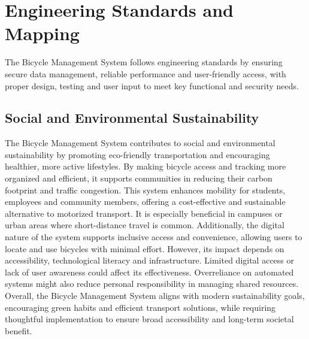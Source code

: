 \chapter{Engineering Standards and Mapping}
The Bicycle Management System follows engineering standards by ensuring secure data management, reliable performance and user-friendly access, with proper design, testing and user input to meet key functional and security needs.

\section{Social and Environmental Sustainability}
The Bicycle Management System contributes to social and environmental sustainability by promoting eco-friendly transportation and encouraging healthier, more active lifestyles. By making bicycle access and tracking more organized and efficient, it supports communities in reducing their carbon footprint and traffic congestion.
This system enhances mobility for students, employees and community members, offering a cost-effective and sustainable alternative to motorized transport. It is especially beneficial in campuses or urban areas where short-distance travel is common. Additionally, the digital nature of the system supports inclusive access and convenience, allowing users to locate and use bicycles with minimal effort.
However, its impact depends on accessibility, technological literacy and infrastructure. Limited digital access or lack of user awareness could affect its effectiveness. Overreliance on automated systems might also reduce personal responsibility in managing shared resources.\\
Overall, the Bicycle Management System aligns with modern sustainability goals, encouraging green habits and efficient transport solutions, while requiring thoughtful implementation to ensure broad accessibility and long-term societal benefit.
\cite{4.1}



